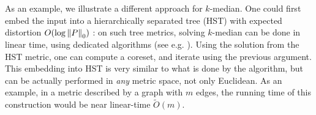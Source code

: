 As an example, we illustrate a different approach for $k$-median. One could first embed the input into a hierarchically separated tree (HST) with expected distortion $O(\log \left\| P \right\|_0)$ \cite{FakcharoenpholRT03}: on such tree metrics, solving $k$-median can be done in linear time, using dedicated algorithms (see e.g. \cite{Cohen-AddadLNSS21}). Using the solution from the HST metric, one can compute a coreset, and iterate using the previous argument.
This embedding into HST is very similar to what is done by the \fkmeans algorithm, but can be actually performed in \emph{any} metric space, not only Euclidean. 
As an example, in a metric described by a graph with $m$ edges, the running time of this construction would be near linear-time $\tilde O(m)$.

